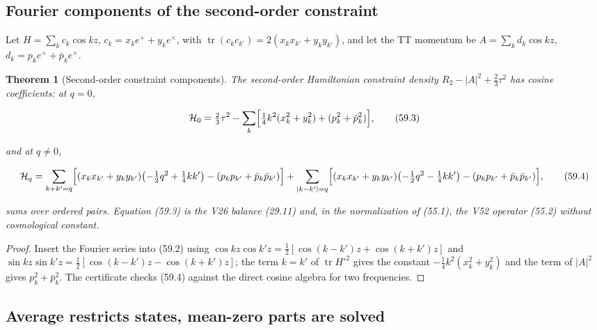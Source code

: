 \documentclass[11pt]{article}
\newtheorem{theorem}{Theorem}[section]
\theoremstyle{remark}
\begin{document}
\subsection{Fourier components of the second-order constraint}

Let \(H=\sum_kc_k\cos kz\), \(c_k=x_ke^++y_ke^\times\), with
\(\operatorname{tr}(c_kc_{k'})=2(x_kx_{k'}+y_ky_{k'})\), and let the TT
momentum be \(A=\sum_kd_k\cos kz\), \(d_k=p_ke^++\bar p_ke^\times\).

\begin{theorem}[Second-order constraint components]
\label{thm:v19v56-components}
The second-order Hamiltonian constraint density
\(R_2-|A|^2+\tfrac23\tau^2\) has cosine coefficients: at \(q=0\),

\[
 {\cal H}_0=\tfrac23\tau^2-\sum_k\Bigl[\tfrac14k^2(x_k^2+y_k^2)+(p_k^2+\bar p_k^2)\Bigr],
                                                                    \tag{59.3}
\]

and at \(q\neq0\),

\[
 {\cal H}_q=\sum_{k+k'=q}\Bigl[(x_kx_{k'}+y_ky_{k'})\bigl(-\tfrac12q^2+\tfrac14kk'\bigr)
 -(p_kp_{k'}+\bar p_k\bar p_{k'})\Bigr]
 +\sum_{|k-k'|=q}\Bigl[(x_kx_{k'}+y_ky_{k'})\bigl(-\tfrac12q^2-\tfrac14kk'\bigr)
 -(p_kp_{k'}+\bar p_k\bar p_{k'})\Bigr],                              \tag{59.4}
\]

sums over ordered pairs.  Equation (59.3) is the V26 balance
(29.11) and, in the normalization of (55.1), the V52 operator (55.2)
without cosmological constant.
\end{theorem}

\begin{proof}
Insert the Fourier series into (59.2) using
\(\cos kz\cos k'z=\tfrac12[\cos(k-k')z+\cos(k+k')z]\) and
\(\sin kz\sin k'z=\tfrac12[\cos(k-k')z-\cos(k+k')z]\); the term
\(k=k'\) of \(\operatorname{tr}H'^2\) gives the constant
\(-\tfrac14k^2(x_k^2+y_k^2)\) and the term of \(|A|^2\) gives
\(p_k^2+\bar p_k^2\).  The certificate checks (59.4) against the direct
cosine algebra for two frequencies.
\end{proof}

\subsection{Average restricts states, mean-zero parts are solved}
\end{document}
